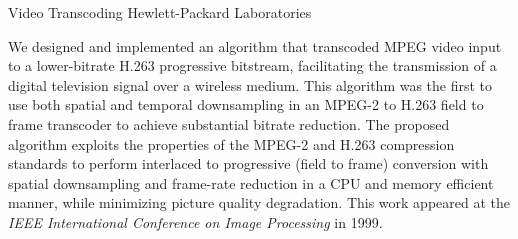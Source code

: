 \documentclass{article}
\begin{document}
\begin{cv}{}
{\mf Video Transcoding} \hfill Hewlett-Packard Laboratories
\vspace*{-0.1in}

    We designed and implemented an algorithm that transcoded MPEG video
    input to a lower-bitrate H.263 progressive bitstream, facilitating
    the transmission of a digital television signal over a wireless
    medium.  This algorithm was the first
    to use both spatial and temporal downsampling in an MPEG-2 to H.263
    field to frame transcoder to achieve substantial bitrate reduction.
    The proposed algorithm exploits the properties of the MPEG-2 and
    H.263 compression standards to perform interlaced to progressive
    (field to frame) conversion with spatial downsampling and frame-rate
    reduction in a CPU and memory efficient manner, while
    minimizing picture quality degradation.  This work appeared at the
    {\em IEEE International Conference on Image Processing} in 1999.
\fi



\end{cv}
\end{document}
